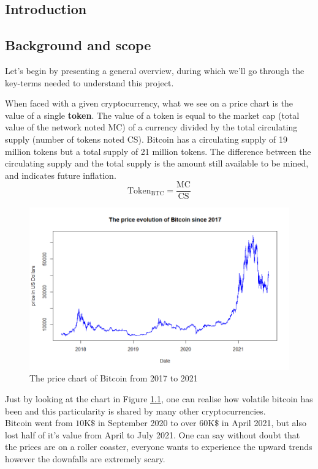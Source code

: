 \documentclass[twoside]{report}
\date{June 2021}
\begin{document}
\begin{spacing}{1}

\selectfont
\tableofcontents



\chapter{Introduction}

\section{Background and scope}
Let's begin by presenting a general overview, during which we'll go through the key-terms needed to understand this project.

When faced with a given cryptocurrency, what we see on a price chart is the value of a single \textbf{token}.
The value of a token is equal to the market cap (total value of the network noted MC) of a currency divided by the total circulating supply (number of tokens noted CS).
Bitcoin has a circulating supply of 19 million tokens but a total supply of 21 million tokens. The difference between the circulating supply and the total supply is the amount still available to be mined, and indicates future inflation. 
$$\text{Token}_\text{BTC}=\frac{\text{MC}}{\text{CS}}$$
\begin{figure}[!htbp]
    \centering
    \includegraphics[scale = 0.7]{TestPlots/BTC_overview.png}
    \caption{The price chart of Bitcoin from 2017 to 2021}
    \label{BTC overall}
\end{figure}

Just by looking at the chart in Figure \ref{BTC overall}, one can realise how volatile bitcoin has been and this particularity is shared by many other cryptocurrencies.\\
Bitcoin went from $10\text{K}\$$ in September 2020 to over $60\text{K}\$$ in April 2021, but also lost half of it's value from April to July 2021.
One can say without doubt that the prices are on a roller coaster, everyone wants to experience the upward trends however the downfalls are extremely scary.\\


\end{spacing}
\end{document}

